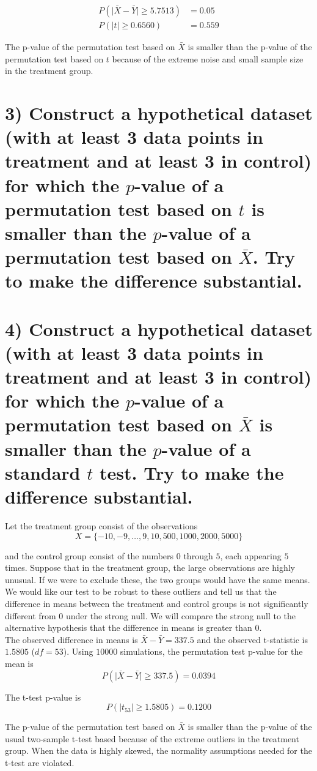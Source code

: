 \documentclass[11pt]{article}
\newcommand{\pr}{P} %
\begin{document}
\begin{align*}
\pr(\lvert \bar{X} - \bar{Y} \rvert \geq 5.7513) &= 0.05 \\
\pr(\lvert t\rvert \geq 0.6560) &= 0.559
\end{align*}

The p-value of the permutation test based on $\bar{X}$ is smaller than the p-value of the permutation test based on $t$ because of the extreme noise and small sample size in the treatment group.  

\section*{3) Construct a hypothetical dataset (with at least 3 data points in treatment and at least 3 in control) for which the $p$-value of a permutation test based on $t$ is smaller than the $p$-value of a permutation test based on $\bar{X}$. Try to make the difference substantial.}


\section*{4) Construct a hypothetical dataset (with at least 3 data points in treatment and at least 3 in control) for which the $p$-value of a permutation test based on $\bar{X}$ is smaller than the $p$-value of a standard $t$ test. Try to make the difference substantial.}

Let the treatment group consist of the observations
$$ X = \{ -10, -9, \dots, 9, 10, 500, 1000, 2000, 5000\}$$

and the control group consist of the numbers $0$ through $5$, each appearing $5$ times.  Suppose that in the treatment group, the large observations are highly unusual.  If we were to exclude these, the two groups would have the same means.  We would like our test to be robust to these outliers and tell us that the difference in means between the treatment and control groups is not significantly different from $0$ under the strong null.  We will compare the strong null to the alternative hypothesis that the difference in means is greater than $0$.  \\

The observed difference in means is $\bar{X} - \bar{Y} = 337.5$ and the observed t-statistic is $1.5805$ ($df = 53$).  Using $10000$ simulations, the permutation test p-value for the mean is
$$\pr(\lvert \bar{X} - \bar{Y}\rvert \geq 337.5) = 0.0394 $$

The t-test p-value is
$$\pr(\lvert t_{53}\rvert \geq 1.5805) = 0.1200 $$


The p-value of the permutation test based on $\bar{X}$ is smaller than the p-value of the usual two-sample t-test based because of the extreme outliers in the treatment group.  When the data is highly skewed, the normality assumptions needed for the t-test are violated.
\end{document}
